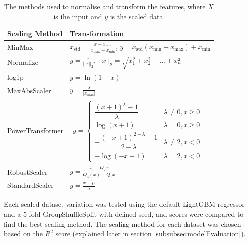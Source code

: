 \documentclass[11pt, titlepage]{article}
\begin{document}
\begin{table}[h]
	\centering
	\small

	\begin{tabularx}{0.8\linewidth}{|l|X|} %
		\hline
		\textbf{Scaling Method} & \textbf{Transformation}\\
		\hline
		MinMax & $x_{\text{std}} = \frac{x - x_{\text{min}}}{x_{\text{max}} - x_{\text{min}}}$, $y = x_{\text{std}}(x_{\text{min}} - x_{\text{max}}) + x_{\text{min}}$\cite{MinMaxScaler}\\
		Normalize & $y = \frac{x}{||x||_2}$, $||x||_2 = \sqrt{x^2_1 + x^2_2 + ... + x_n^2}$\cite{FeatEngForML}\\
		log1p & $y = \ln(1+x)$ \cite{nplog1p}\\
		MaxAbsScaler & $y = \frac{X}{|x_{\text{max}}|}$\cite{MaxAbsEq}\\

		PowerTransformer & 
		$\begin{aligned}
			y = \left\{
				\begin{array}{ll}
				\dfrac{(x + 1) ^ \lambda - 1}{\lambda}              & \lambda \neq 0, x \geq 0 \\
				\log(x + 1)                                         & \lambda =    0, x \geq 0 \\
				- \dfrac{(-x + 1) ^ {2 - \lambda} - 1}{2 - \lambda} & \lambda \neq 2, x <    0 \\
				- \log(-x + 1)                                      & \lambda =    2, x <    0
				\end{array}
			\right.
		\end{aligned}$ \cite{YeoJohnsonFEAZ, YeoJohnsonScipy}\\

		RobustScaler & $y = \frac{x_i - Q_2{x}}{Q_3(x) - Q_1{x}}$\cite{RobustEq}\\
		StandardScaler & $y = \frac{x-\mu}{\sigma}$ \cite{StandardScaler}\\
		\hline
	\end{tabularx}

	\caption{The methods used to normalise and transform the features, where $X$ is the input and $y$ is the scaled data.}
	\label{tab:scalingMethods}
\end{table}

Each scaled dataset variation was tested using the default LightGBM regressor\cite{LGBMRegressor} and a 5 fold GroupShuffleSplit with defined seed, and scores were compared to find the best scaling method. The scaling method for each dataset was chosen based on the $R^2$ score (explained later in section \ref{subsubsec:modelEvaluation}). 
\end{document}
